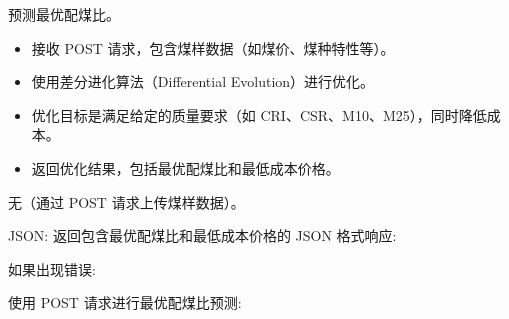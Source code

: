 \documentclass[a4paper,12pt,english]{sphinxmanual}
\begin{document}
\begin{fulllineitems}
\label{\detokenize{api/login:login.predictBestRatio}}
\pysigstartsignatures
{}
\pysigstopsignatures
\sphinxAtStartPar
预测最优配煤比。
\begin{description}
\begin{itemize}
\item {} 
\sphinxAtStartPar
接收 POST 请求，包含煤样数据（如煤价、煤种特性等）。

\item {} 
\sphinxAtStartPar
使用差分进化算法（Differential Evolution）进行优化。

\item {} 
\sphinxAtStartPar
优化目标是满足给定的质量要求（如 CRI、CSR、M10、M25），同时降低成本。

\item {} 
\sphinxAtStartPar
返回优化结果，包括最优配煤比和最低成本价格。

\end{itemize}

\sphinxAtStartPar
无（通过 POST 请求上传煤样数据）。

\sphinxAtStartPar
JSON: 返回包含最优配煤比和最低成本价格的 JSON 格式响应:

\begin{sphinxVerbatim}[commandchars=\\\{\}]
     \PYG{p}{[}  \PYG{p}{]}
     
\end{sphinxVerbatim}

\sphinxAtStartPar
如果出现错误:

\begin{sphinxVerbatim}[commandchars=\\\{\}]
     
\end{sphinxVerbatim}

\sphinxAtStartPar
使用 POST 请求进行最优配煤比预测:


\end{description}
\end{fulllineitems}
\end{document}
